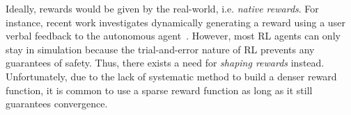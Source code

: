 Ideally, rewards would be given by the real-world, i.e. \textit{native rewards}. For instance, recent work investigates dynamically generating a reward 
using a user verbal feedback to the autonomous agent~\cite{gonzalez2010}.
%
%
However, most RL agents can only stay in simulation because the trial-and-error nature of RL prevents any guarantees of safety.
Thus, there exists a need for \textit{shaping rewards} instead.
%
Unfortunately, due to the lack of systematic method to build a denser reward function, 
it is common to use a sparse reward function as long as it still guarantees convergence.